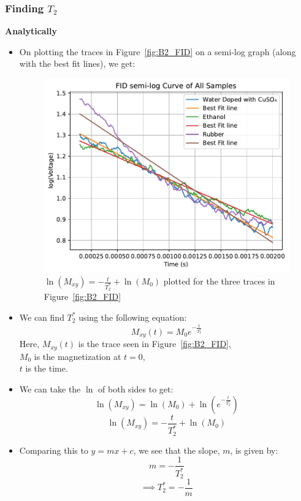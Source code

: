 \documentclass{article}
\begin{document}
\subsubsection{Finding $T_2$}
\textbf{Analytically}
\begin{itemize}
    \item On plotting the traces in Figure~\ref{fig:B2_FID} on a semi-log graph (along with the best fit lines), we get:
    \begin{figure}[h!]
        \centering
        \includegraphics[scale = 0.78]{../images/B2_log_best_fit}
        \caption{$\ln(M_{xy}) = -\frac{t}{T_2^*} + \ln(M_0)$ plotted for the three traces in Figure~\ref{fig:B2_FID}}
        \label{fig:B2_FID_log_best_fit}
    \end{figure}

    \item We can find $T_2^*$ using the following equation:
    \[ M_{xy}(t) = M_0 e^{-\frac{t}{T_2^*}} \]
    Here, $M_{xy}(t)$ is the trace seen in Figure~\ref{fig:B2_FID},\\
    $M_0$ is the magnetization at $t=0$,\\
    $t$ is the time.
    \item We can take the $\ln$ of both sides to get:
    \[ \ln(M_{xy}) = \ln(M_0) + \ln\left(e^{-\frac{t}{T_2^*}}\right) \]
    \[ \ln(M_{xy}) = -\frac{t}{T_2^*} + \ln(M_0) \]
    \item Comparing this to $y = mx + c$, we see that the slope, $m$, is given by:
    \[ m = -\frac{1}{T_2^*} \]
    \[ \implies T_2^* = -\frac{1}{m} \]
\end{itemize}
\end{document}
